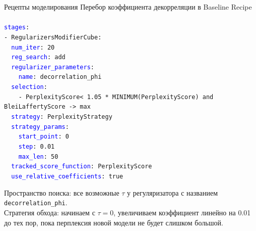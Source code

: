 \begin{frame}[t]{Рецепты моделирования}
Перебор коэффициента декорреляции в Baseline Recipe\\

\footnotesize \texttt{\\
\textcolor{blue}{stages}: \\
- RegularizersModifierCube: \\
\ \ \textcolor{blue}{num\_iter}: 20 \\
\ \ \textcolor{blue}{reg\_search}: add \\
\ \ \textcolor{blue}{regularizer\_parameters}: \\
\ \ \ \ \textcolor{blue}{name}: decorrelation\_phi \\
\ \ \textcolor{blue}{selection}: \\
\ \ \ \ - PerplexityScore\@all < 1.05 * MINIMUM(PerplexityScore\@all) and BleiLaffertyScore -> max \\
\ \ \textcolor{blue}{strategy}: PerplexityStrategy \\
\ \ \textcolor{blue}{strategy\_params}: \\
\ \ \ \ \textcolor{blue}{start\_point}: 0 \\
\ \ \ \ \textcolor{blue}{step}: 0.01 \\
\ \ \ \ \textcolor{blue}{max\_len}: 50 \\
\ \ \textcolor{blue}{tracked\_score\_function}: PerplexityScore\@all \\
\ \ \textcolor{blue}{use\_relative\_coefficients}: true	\\
}

Пространство поиска: все возможные $\tau$ у регуляризатора с названием \texttt{decorrelation\_phi}.\\

Стратегия обхода: начинаем с $\tau=0$, увеличиваем коэффициент линейно на 0.01 до тех пор, пока перплексия новой модели не будет слишком большой.
\end{frame}


